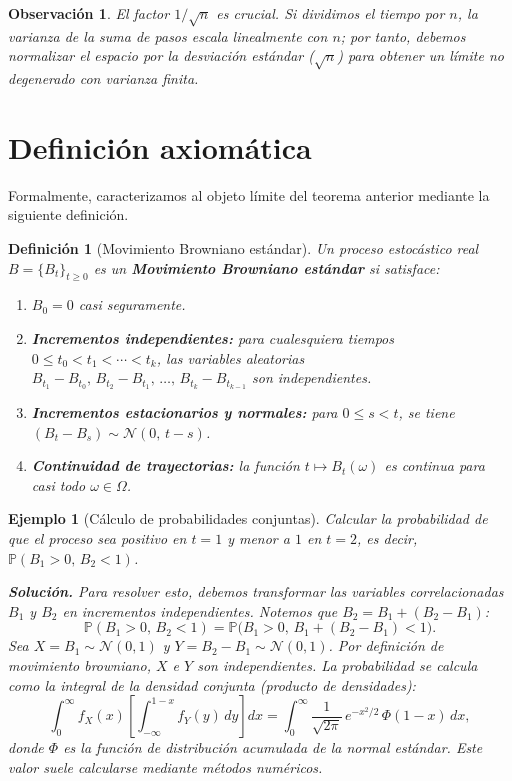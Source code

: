 \documentclass[12pt]{book}
\newtheorem{definition}{Definición}[chapter]
\newtheorem{example}{Ejemplo}[chapter]
\newtheorem{remark}{Observación}[chapter]
\begin{document}
\begin{remark}
El factor $1/\sqrt{n}$ es crucial. Si dividimos el tiempo por $n$, la varianza de la suma de pasos escala linealmente con $n$; por tanto, debemos normalizar el espacio por la desviación estándar ($\sqrt{n}$) para obtener un límite no degenerado con varianza finita.
\end{remark}

\section{Definición axiomática}

Formalmente, caracterizamos al objeto límite del teorema anterior mediante la siguiente definición.

\begin{definition}[Movimiento Browniano estándar]
Un proceso estocástico real $B = \{B_t\}_{t \ge 0}$ es un \textbf{Movimiento Browniano estándar} si satisface:
\begin{enumerate}
    \item[\normalfont(a)] $B_0 = 0$ casi seguramente.
    \item[\normalfont(b)] \textbf{Incrementos independientes:} para cualesquiera tiempos $0 \le t_0 < t_1 < \cdots < t_k$, las variables aleatorias $B_{t_1}-B_{t_0},\, B_{t_2}-B_{t_1},\, \ldots,\, B_{t_k}-B_{t_{k-1}}$ son independientes.
    \item[\normalfont(c)] \textbf{Incrementos estacionarios y normales:} para $0 \le s < t$, se tiene $(B_t - B_s) \sim \mathcal{N}(0,\, t-s)$.
    \item[\normalfont(d)] \textbf{Continuidad de trayectorias:} la función $t \mapsto B_t(\omega)$ es continua para casi todo $\omega \in \Omega$.
\end{enumerate}
\end{definition}

\begin{example}[Cálculo de probabilidades conjuntas]
Calcular la probabilidad de que el proceso sea positivo en $t=1$ y menor a $1$ en $t=2$, es decir, $\mathbb{P}(B_1 > 0,\, B_2 < 1)$.

\textbf{Solución.} Para resolver esto, debemos transformar las variables correlacionadas $B_1$ y $B_2$ en incrementos independientes. Notemos que $B_2 = B_1 + (B_2 - B_1)$:
\[
    \mathbb{P}(B_1 > 0,\, B_2 < 1) = \mathbb{P}\bigl(B_1 > 0,\, B_1 + (B_2 - B_1) < 1\bigr).
\]
Sea $X = B_1 \sim \mathcal{N}(0,1)$ y $Y = B_2 - B_1 \sim \mathcal{N}(0,1)$. Por definición de movimiento browniano, $X$ e $Y$ son independientes. La probabilidad se calcula como la integral de la densidad conjunta (producto de densidades):
\[
    \int_{0}^{\infty} f_X(x) \left[ \int_{-\infty}^{1-x} f_Y(y)\, dy \right] dx
    = \int_{0}^{\infty} \frac{1}{\sqrt{2\pi}}\, e^{-x^2/2}\, \Phi(1-x)\, dx,
\]
donde $\Phi$ es la función de distribución acumulada de la normal estándar. Este valor suele calcularse mediante métodos numéricos.
\end{example}
\end{document}
